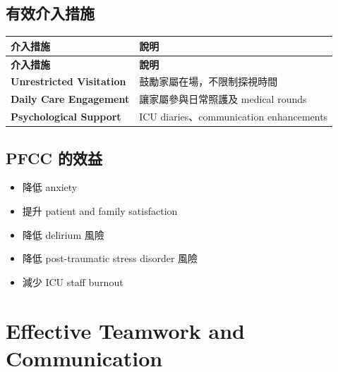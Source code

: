 \documentclass[12pt,a4paper]{article}
\begin{document}
\subsection{有效介入措施}

\begin{longtable}{p{4cm}p{10cm}}
\toprule
\textbf{介入措施} & \textbf{說明} \\
\midrule
\endfirsthead

\toprule
\textbf{介入措施} & \textbf{說明} \\
\midrule
\endhead

\bottomrule
\endfoot

\textbf{Unrestricted Visitation} & 鼓勵家屬在場，不限制探視時間 \\
\midrule
\textbf{Daily Care Engagement} & 讓家屬參與日常照護及 medical rounds \\
\midrule
\textbf{Psychological Support} & ICU diaries、communication enhancements \\
\bottomrule
\end{longtable}

\subsection{PFCC 的效益}

\begin{itemize}
    \item 降低 anxiety
    \item 提升 patient and family satisfaction
    \item 降低 delirium 風險
    \item 降低 post-traumatic stress disorder 風險
    \item 減少 ICU staff burnout
\end{itemize}

\section{Effective Teamwork and Communication}
\end{document}
